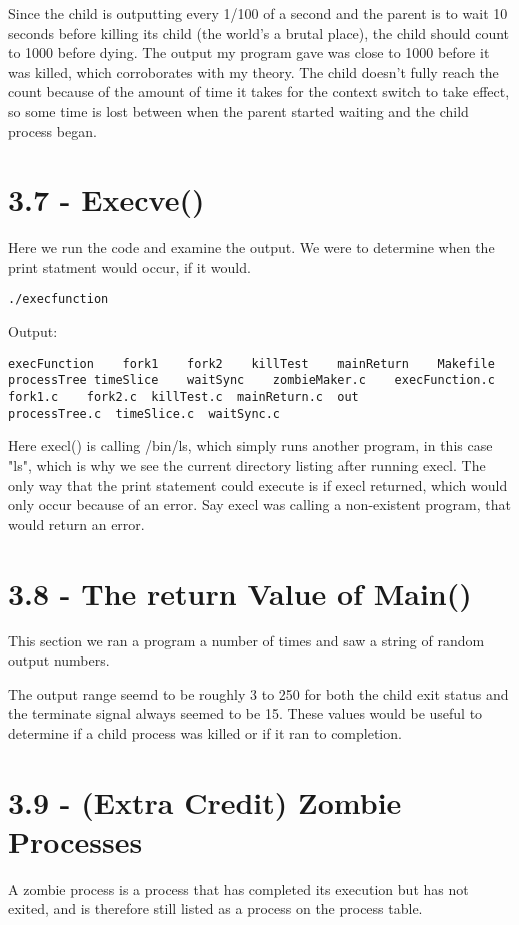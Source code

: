 \documentclass[11pt]{report}
\begin{document}
Since the child is outputting every 1/100 of a second and the parent is to wait 10 seconds before killing its child (the world's a brutal place), the child should count to 1000 before dying. The output my program gave was close to 1000 before it was killed, which corroborates with my theory. The child doesn't fully reach the count because of the amount of time it takes for the context switch to take effect, so some time is lost between when the parent started waiting and the child process began.

\section*{3.7 - Execve()}
Here we run the code and examine the output. We were to determine when the print statment would occur, if it would.

\begin{verbatim}
./execfunction
\end{verbatim}
 Output:
 \begin{verbatim}
execFunction    fork1    fork2    killTest    mainReturn    Makefile  
processTree timeSlice    waitSync    zombieMaker.c    execFunction.c    
fork1.c    fork2.c  killTest.c  mainReturn.c  out       
processTree.c  timeSlice.c  waitSync.c
 \end{verbatim}
 
 Here execl() is calling /bin/ls, which simply runs another program, in this case "ls", which is why we see the current directory listing after running execl. The only way that the print statement could execute is if execl returned, which would only occur because of an error. Say execl was calling a non-existent program, that would return an error.
 
\newpage
\section*{3.8 - The return Value of Main()}

This section we ran a program a number of times and saw a string of random output numbers.

The output range seemd to be roughly 3 to 250 for both the child exit status and the terminate signal always seemed to be 15.
These values would be useful to determine if a child process was killed or if it ran to completion.



\newpage
\section*{3.9 - (Extra Credit) Zombie Processes}
A zombie process is a process that has completed its execution but has not exited, and is therefore still listed as a process on the process table.
\end{document}
